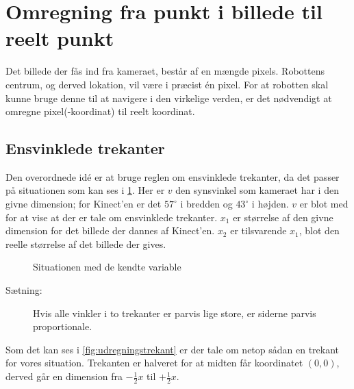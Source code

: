 \section{Omregning fra punkt i billede til reelt punkt}\label{lokalisering:punktomregning}
Det billede der fås ind fra kameraet, består af en mængde pixels.
Robottens centrum, og derved lokation, vil være i præcist én pixel.
For at robotten skal kunne bruge denne til at navigere i den virkelige verden, er det nødvendigt at omregne pixel(-koordinat) til reelt koordinat.

\subsection{Ensvinklede trekanter}
Den overordnede idé er at bruge reglen om ensvinklede trekanter, da det passer på situationen som kan ses i \cref{fig:kameratrekant}.
Her er $v$ den synsvinkel som kameraet har i den givne dimension; for Kinect'en er det $57^\circ$ i bredden og $43^\circ$ i højden.
$v$ er blot med for at vise at der er tale om ensvinklede trekanter.
$x_1$ er størrelse af den givne dimension for det billede der dannes af Kinect'en.
$x_2$ er tilsvarende $x_1$, blot den reelle størrelse af det billede der gives.

\begin{figure}[h]
\centering
{}
\caption{Situationen med de kendte variable}
\label{fig:kameratrekant}
\end{figure}

\begin{description}
\item[Sætning:]{Hvis alle vinkler i to trekanter er parvis lige store, er siderne parvis proportionale.}
\end{description}
Som det kan ses i \cref{fig:udregningstrekant} er der tale om netop sådan en trekant for vores situation.
Trekanten er halveret for at midten får koordinatet $(0,0)$, derved går en dimension fra $-\frac{1}{2}x$ til $+\frac{1}{2}x$.

